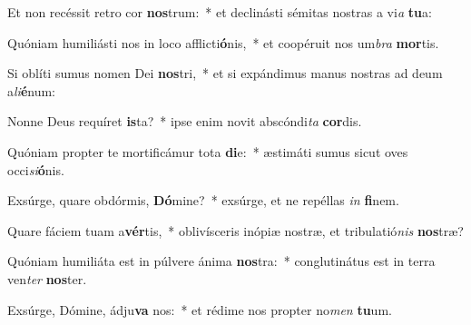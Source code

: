 \item Et non recéssit retro cor \textbf{nos}trum:~* et declinásti sémitas nostras a vi\textit{a} \textbf{tu}a:
\item Quóniam humiliásti nos in loco afflicti\textbf{ó}nis,~* et coopéruit nos um\textit{bra} \textbf{mor}tis.
\item Si oblíti sumus nomen Dei \textbf{nos}tri,~* et si expándimus manus nostras ad deum a\textit{li}\textbf{é}num:
\item Nonne Deus requíret \textbf{is}ta?~* ipse enim novit abscóndi\textit{ta} \textbf{cor}dis.
\item Quóniam propter te mortificámur tota \textbf{di}e:~* æstimáti sumus sicut oves occi\textit{si}\textbf{ó}nis.
\item Exsúrge, quare obdórmis, \textbf{Dó}mine?~* exsúrge, et ne repéllas \textit{in} \textbf{fi}nem.
\item Quare fáciem tuam a\textbf{vér}tis,~* oblivísceris inópiæ nostræ, et tribulatió\textit{nis} \textbf{nos}træ?
\item Quóniam humiliáta est in púlvere ánima \textbf{nos}tra:~* conglutinátus est in terra ven\textit{ter} \textbf{nos}ter.
\item Exsúrge, Dómine, ádju\textbf{va} nos:~* et rédime nos propter no\textit{men} \textbf{tu}um.

